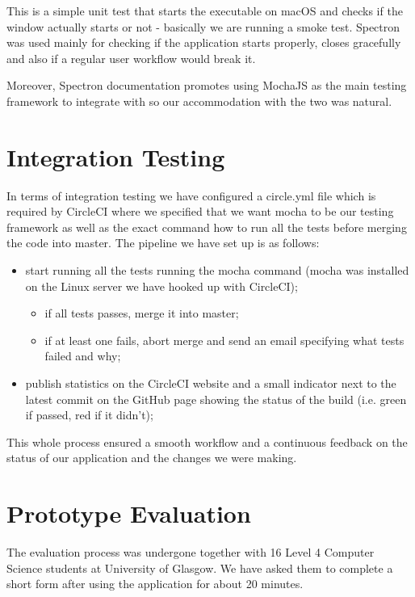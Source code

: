 \documentclass{l4proj}
\begin{document}
This is a simple unit test that starts the executable on macOS and checks if the window actually starts or not -
basically we are running a smoke test. Spectron was used mainly for checking if the application starts properly,
closes gracefully and also if a regular user workflow would break it.

Moreover, Spectron documentation promotes using MochaJS as the main testing framework to integrate with so our
accommodation with the two was natural.

\section{Integration Testing}

In terms of integration testing we have configured a circle.yml file which is required by CircleCI where we specified
that we want mocha to be our testing framework as well as the exact command how to run all the tests before merging
the code into master. The pipeline we have set up is as follows:

\begin{itemize}
  \item start running all the tests running the mocha command (mocha was installed on the Linux server we have hooked
    up with CircleCI);
    \begin{itemize}
      \item if all tests passes, merge it into master;
      \item if at least one fails, abort merge and send an email specifying what tests failed and why;
    \end{itemize}
  \item publish statistics on the CircleCI website and a small indicator next to the latest commit on the GitHub page
    showing the status of the build
    (i.e. green if passed, red if it didn't);
\end{itemize}

This whole process ensured a smooth workflow and a continuous feedback on the status of our application and the
changes we were making.

\section{Prototype Evaluation}

The evaluation process was undergone together with 16 Level 4 Computer Science students at University of Glasgow. We
have asked them to complete a short form after using the application for about 20 minutes.
\end{document}
